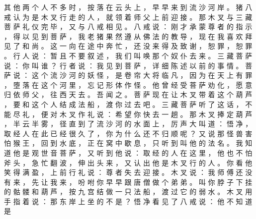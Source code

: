 {其 他 两 个 人 不 多 时 ， 按 落 在 云 头 上 ， 早 早 来 到 流 沙 河 岸 。
猪 八 戒 认 为 是 木 叉 行 走 的 人 ， 就 领 着 师 父 上 前 迎 接 。
那 木 叉 与 三 藏 菩 萨 礼 仪 完 毕 ， 又 与 八 戒 相 见 。
八 戒 说 ： 刚 才 承 蒙 尊 者 的 指 示 ， 得 以 见 到 菩 萨 ， 我 老 猪 果 然 遵 从 佛 法 的 教 导 ， 现 在 我 喜 欢 拜 见 了 和 尚 。
这 一 向 在 途 中 奔 忙 ， 还 没 来 得 及 致 谢 ， 恕 罪 ， 恕 罪 。
行 人 说 ： 暂 且 不 要 叙 述 ， 我 们 叫 唤 那 个 奴 仆 去 来 。
三 藏 菩 萨 说 ： 你 叫 谁 ？ 行 者 说 ： 我 见 到 菩 萨 ， 详 细 陈 述 以 前 的 事 情 。
菩 萨 说 ： 这 个 流 沙 河 的 妖 怪 ， 是 卷 帘 大 将 临 凡 ， 因 为 在 天 上 有 罪 ， 堕 落 在 这 个 河 里 ， 忘 记 形 体 作 怪 。
他 曾 经 受 菩 萨 劝 化 ， 愿 意 归 依 师 父 ， 往 西 天 去 。
吾 闻 之 。
菩 萨 现 在 让 木 叉 带 着 这 个 葫 芦 ， 要 和 这 个 人 结 成 法 船 ， 渡 你 过 去 吧 。
三 藏 菩 萨 听 了 这 话 ， 不 能 尽 礼 ， 便 对 木 叉 作 礼 说 ： 希 望 你 快 去 一 趟 。
那 木 叉 捧 定 葫 芦 ， 半 云 半 雾 ， 径 直 到 了 流 沙 河 的 水 面 上 ， 厉 声 大 叫 道 ： 悟 净 ， 取 经 人 在 此 已 经 很 久 了 ， 你 为 什 么 还 不 归 顺 呢 ？ 又 说 那 怪 兽 害 怕 猴 王 ， 回 到 水 底 ， 正 在 窝 中 歇 息 ， 只 听 到 叫 他 的 法 名 。
我 知 道 他 是 观 世 音 菩 萨 ， 又 听 到 他 说 ： 取 经 的 人 在 这 里 ， 他 也 不 怕 斧 头 ， 急 忙 翻 波 ， 伸 出 头 来 ， 又 认 出 他 是 木 叉 行 的 人 。
你 看 他 笑 得 满 盈 ， 上 前 行 礼 说 ： 尊 者 失 去 迎 接 。
木 叉 说 ： 我 师 傅 还 没 有 来 ， 先 让 我 来 ， 吩 咐 你 早 早 跟 唐 僧 做 个 弟 弟 。
叫 你 脖 子 下 挂 的 骷 髅 和 葫 芦 ， 按 九 宫 结 做 一 只 法 船 ， 渡 过 它 的 弱 水 。
木 叉 用 手 指 着 说 ： 那 东 岸 上 坐 的 不 是 ？ 悟 净 看 见 了 八 戒 说 ： 他 不 知 道 是

 }\switchcolumn\flushpage